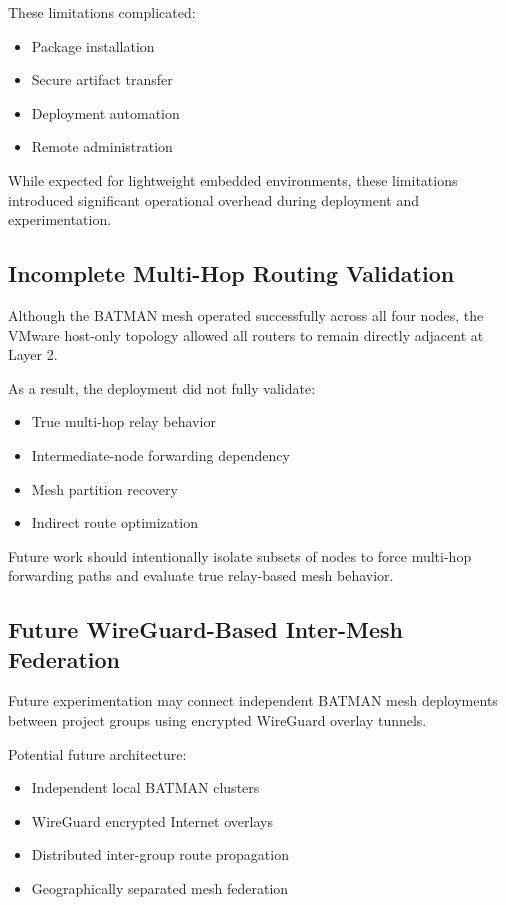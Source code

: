 \documentclass[conference]{IEEEtran}
\begin{document}
These limitations complicated:
\begin{itemize}
    \item Package installation
    \item Secure artifact transfer
    \item Deployment automation
    \item Remote administration
\end{itemize}

While expected for lightweight embedded environments, these limitations introduced significant operational overhead during deployment and experimentation.

\subsection{Incomplete Multi-Hop Routing Validation}

Although the BATMAN mesh operated successfully across all four nodes, the VMware host-only topology allowed all routers to remain directly adjacent at Layer 2.

As a result, the deployment did not fully validate:

\begin{itemize}
    \item True multi-hop relay behavior
    \item Intermediate-node forwarding dependency
    \item Mesh partition recovery
    \item Indirect route optimization
\end{itemize}

Future work should intentionally isolate subsets of nodes to force multi-hop forwarding paths and evaluate true relay-based mesh behavior.

\subsection{Future WireGuard-Based Inter-Mesh Federation}

Future experimentation may connect independent BATMAN mesh deployments between project groups using encrypted WireGuard overlay tunnels.

Potential future architecture:

\begin{itemize}
    \item Independent local BATMAN clusters
    \item WireGuard encrypted Internet overlays
    \item Distributed inter-group route propagation
    \item Geographically separated mesh federation
\end{itemize}
\end{document}
